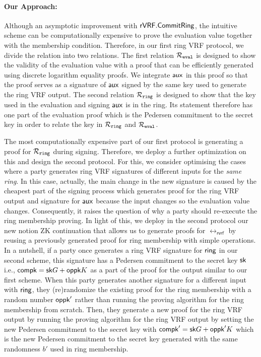 \paragraph{Our Approach:} Although an asymptotic improvement with $ {\mathsf{rVRF}}.{\mathsf{CommitRing}} $, 
the intuitive scheme can be computationally expensive to prove the evaluation value together with the membership condition. Therefore, in our first ring VRF protocol,  we divide the relation into two relations. The first relation $ \mathcal{R}_{\mathtt{eval}} $ is designed  to show the validity of the evaluation value with a proof that can be efficiently generated using discrete logarithm equality proofs. We integrate $ \mathsf{aux} $ in this proof so that the proof serves as a signature of $ \mathsf{aux} $ signed by the same key used to generate the ring VRF output.  The second relation $ \mathcal{R}_{\mathtt{ring}} $ is designed to show that the key used in the evaluation and signing $ \mathsf{aux} $ is in the ring. Its statement therefore has one part of the evaluation proof which is the Pedersen commitment to the secret key in order to relate the key in $ \mathcal{R}_{\mathtt{ring}} $ and $ \mathcal{R}_{\mathtt{eval}} $.

The most computationally expensive part of our first protocol is generating a proof for $ \mathcal{R}_{\mathtt{ring}} $ during signing. Therefore, we deploy a further optimization on this and design the second protocol. For this,  we consider optimising the cases where a party generates ring VRF signatures of different inputs for the \emph{same ring}. In this case, actually, the main change in the new signature is caused by the cheapest part of the signing process which generates proof for the ring VRF output and signature for $ \mathsf{aux} $  because the input changes so the evaluation value changes. Consequently, it raises the question of why a party should re-execute the ring membership proving.  In light of this, we deploy in the second protocol our  new notion ZK continuation that allows us to generate proofs for $ \rel_{\mathsf{rvrf}} $ by reusing a previously generated proof for ring membership with simple operations. 
In a nutshell, if a party once generates a ring VRF signature for $ \mathsf{ring} $ in our second scheme, this signature has a  Pedersen commitment to the secret key $ \mathsf{sk} $ i.e., $ \mathsf{compk} = \mathsf{sk} G + \mathsf{oppk} K $ as a part of the proof for the output similar to our first scheme. When this party generates another signature for a different input  with $ \mathsf{ring} $, they (re)randomize the  existing proof for the ring membership with a random number $ \mathsf{oppk}' $ rather than  running the proving algorithm for the ring membership from scratch. Then, they generate a new proof for the ring VRF output by running the proving algorithm for the ring VRF output by setting the new Pedersen commitment to the secret key with $ \mathsf{compk}' = \mathsf{sk} G + \mathsf{oppk}'K $ which is the new  Pedersen commitment to the secret key generated  with the same randomness $ b' $ used in ring membership.



